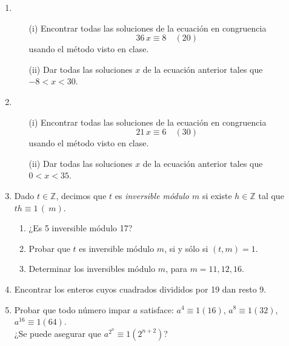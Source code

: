 \documentclass[a4paper,12pt,twoside,spanish,reqno]{amsbook}
\numberwithin{equation}{section}
\begin{document}
\begin{enumerate}
\item 
\begin{enumerate}
    \item[(i)] Encontrar todas las soluciones de la ecuaci\'on en congruencia
    $$36\,x\equiv 8 \quad (20)$$
    usando el método visto en clase.
    \item[(ii)] Dar todas las soluciones $x$ de la ecuaci\'on anterior tales que $-8 < x < 30$.
\end{enumerate}


\item 
\begin{enumerate}
\item[(i)] Encontrar todas las soluciones de la ecuaci\'on en congruencia
$$21\,x\equiv 6 \quad (30)$$
usando el método visto en clase.
\item[(ii)] Dar todas las soluciones $x$ de la ecuaci\'on anterior tales que $0 < x < 35$.
\end{enumerate}





\item Dado $t \in {\mathbb Z}$, decimos que $t$ es {\it inversible m\'odulo $m$} si existe $h \in {\mathbb Z}$ tal que $th\equiv 1\,(\ m)$.
  \begin{enumerate}
  \item ¿Es 5 inversible m\'odulo 17?
  \item Probar que $t$ es inversible m\'odulo $m$, si y s\'olo si $(t,m)=1$.
  \item Determinar los inversibles m\'odulo $m$, para $m=11,12,16$.
  \end{enumerate}




\item Encontrar los enteros cuyos cuadrados divididos por 19 dan resto 9.


\item Probar que todo n\'umero impar $a$ satisface: $a^4 \equiv 1(16)$, $a^8 \equiv 1(32)$, $a^{16}\equiv 1(64)$.\\ ¿Se puede asegurar que $a^{2^n} \equiv 1 (2^{n+2})$?



\end{enumerate}
\end{document}
